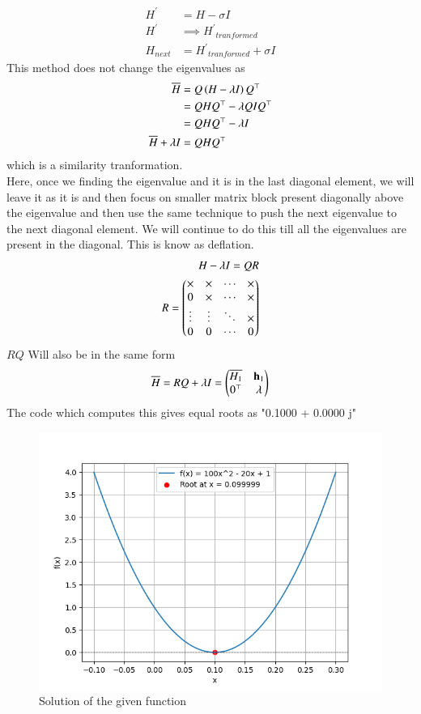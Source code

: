 \documentclass[journal]{IEEEtran}
\begin{document}
\begin{align}
	H^\prime &= H - \sigma I\\
	H^\prime &\implies {H^\prime}_{tranformed}\\
	H_{next} &= {H^\prime}_{tranformed} + \sigma I
\end{align}
This method does not change the eigenvalues as
\begin{align}
\overline{H} &= Q\left(H - \lambda I\right)Q^\top\\
	&= QHQ^\top - \lambda QIQ^\top\\
	&= QHQ^\top - \lambda I\\
\overline{H} +\lambda I &= QHQ^\top
\end{align}
which is a similarity tranformation.\\
Here, once we finding the eigenvalue and it is in the last diagonal element, we will leave it as it is and then focus on smaller matrix block present diagonally above the eigenvalue and then use the same technique to push the next eigenvalue to the next diagonal element. We will continue to do this till all the eigenvalues are present in the diagonal. This is know as deflation.
\begin{align}
H  - \lambda I = QR\\
R = \begin{pmatrix}\times & \times & \cdots & \times\\
	0 & \times & \cdots & \times\\
	\vdots & \vdots & \ddots & \times\\
	0 & 0 & \cdots & 0\end{pmatrix}
\end{align}
$RQ$ Will also be in the same form
\begin{align}
\overline{H} = RQ+\lambda I = \begin{pmatrix}\overline{H_1} & \mathbf{h}_1\\0^\top & \lambda\end{pmatrix}
\end{align}
The code which computes this gives equal roots as "0.1000 + 0.0000 j"
\newline\newline
	\begin{figure}[h!]
		\centering
		\includegraphics[width=\columnwidth]{figs/Figure_1.png}
		\caption{Solution of the given function}
		\label{stemplot}
	\end{figure}
	
\end{document}
